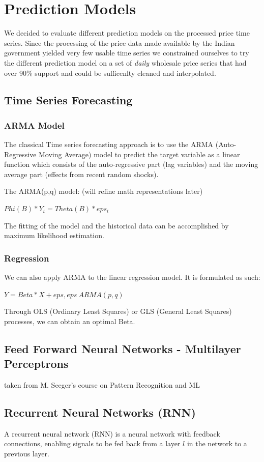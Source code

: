 \section*{Prediction Models}
We decided to evaluate different prediction models on the processed price time series. Since the processing of the price data made available by the Indian government yielded very few usable time series we constrained ourselves to try the different prediction model on a set of \emph{daily} wholesale price series that had over 90\% support and could be sufficenlty cleaned and interpolated.

\subsection*{Time Series Forecasting}

\subsubsection*{ARMA Model}
The classical Time series forecasting approach is to use the ARMA (Auto-Regressive
Moving Average) model to predict the target variable as a linear function which
consists of the auto-regressive part (lag variables) and the moving average part
(effects from recent random shocks).

The ARMA(p,q) model: (will refine math representations later)

$Phi(B) * Y_t = Theta(B) * eps_t$

The fitting of the model and the historical
data can be accomplished by maximum likelihood estimation.

\subsubsection*{Regression}
We can also apply ARMA to the linear regression model. It is formulated as such:

$Y = Beta*X + eps,   eps ~ ARMA(p,q)$

Through OLS (Ordinary Least Squares) or GLS (General Least Squares) processes,
we can obtain an optimal Beta.

\subsection*{Feed Forward Neural Networks - Multilayer Perceptrons}
taken from M. Seeger's course on Pattern Recognition and ML

\subsection*{Recurrent Neural Networks (RNN)}
A recurrent neural network (RNN) is a neural network with feedback connections, enabling signals to be fed back from a layer $l$ in the network to a previous layer. %

